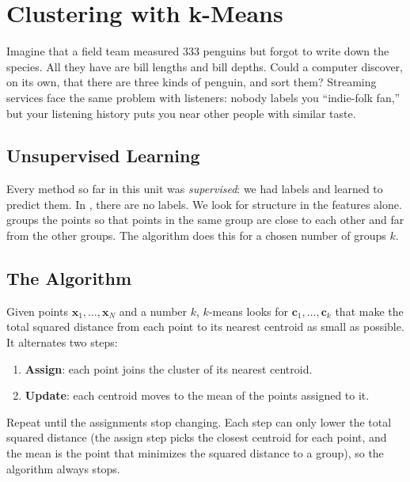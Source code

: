 \chapter{Clustering with k-Means}

Imagine that a field team measured 333 penguins but forgot to write down the species. All they have are bill
lengths and bill depths. Could a computer discover, on its own, that there are three kinds of penguin, and
sort them? Streaming services face the same problem with listeners: nobody labels you ``indie-folk fan,'' but
your listening history puts you near other people with similar taste.

\section{Unsupervised Learning}
Every method so far in this unit was \emph{supervised}: we had labels and learned to predict them. In
, there are no labels. We look for structure in the features alone.
 groups the points so that points in the same group are close to each other
and far from the other groups. The  algorithm does this for a chosen number of groups $k$.

\section{The Algorithm}
Given points $\mathbf{x}_1, \ldots, \mathbf{x}_N$ and a number $k$, $k$-means looks for 
$\mathbf{c}_1, \ldots, \mathbf{c}_k$ that make the total squared distance from each point to its nearest centroid
as small as possible. It alternates two steps:
\begin{enumerate}
\item \textbf{Assign}: each point joins the cluster of its nearest centroid.
\item \textbf{Update}: each centroid moves to the mean of the points assigned to it.
\end{enumerate}
Repeat until the assignments stop changing. Each step can only lower the total squared distance (the assign step
picks the closest centroid for each point, and the mean is the point that minimizes the squared distance to a
group), so the algorithm always stops.

